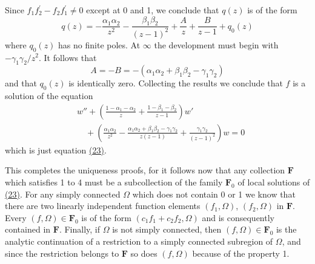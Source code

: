 Since $f_{1}f_{2}^{\prime} - f_{2}f_{1}^{\prime} \neq 0$ except at 0 and 1, we conclude that $q(z)$ is of the form
\begin{equation*}
q (z) = - \frac {\alpha_ {1} \alpha_ {2}}{z ^ {2}} - \frac {\beta_ {1} \beta_ {2}}{(z - 1) ^ {2}} + \frac {A}{z} + \frac {B}{z - 1} + q _ {0} (z)
\end{equation*}
where $q_0(z)$ has no finite poles. At $\infty$ the development must begin with $-\gamma_1\gamma_2 / z^2$. It follows that
\begin{equation*}
A = - B = - \left(\alpha_ {1} \alpha_ {2} + \beta_ {1} \beta_ {2} - \gamma_ {1} \gamma_ {2}\right)
\end{equation*}
and that $q_0(z)$ is identically zero. Collecting the results we conclude that $f$ is a solution of the equation
\begin{equation*}
\begin{aligned}
&w''+\left(\frac{1-\alpha_1-\alpha_2}{z}+\frac{1-\beta_1-\beta_2}{z-1}\right)w'\\
&\quad+\left(\frac{\alpha_1\alpha_2}{z^2}
-\frac{\alpha_1\alpha_2+\beta_1\beta_2-\gamma_1\gamma_2}{z(z-1)}
+\frac{\gamma_1\gamma_2}{(z-1)^2}\right)w=0
\end{aligned}
\end{equation*}
which is just equation \hyperref[eq:8.23]{(23)}.

This completes the uniqueness proofs, for it follows now that any collection $\mathbf{F}$ which satisfies 1 to 4 must be a subcollection of the family $\mathbf{F}_0$ of local solutions of \hyperref[eq:8.23]{(23)}. For any simply connected $\Omega$ which does not contain 0 or 1 we know that there are two linearly independent function elements $(f_1,\Omega)$, $(f_2,\Omega)$ in $\mathbf{F}$. Every $(f,\Omega) \in \mathbf{F}_0$ is of the form $(c_1f_1 + c_2f_2,\Omega)$ and is consequently contained in $\mathbf{F}$. Finally, if $\Omega$ is not simply connected, then $(f,\Omega) \in \mathbf{F}_0$ is the analytic continuation of a restriction to a simply connected subregion of $\Omega$, and since the restriction belongs to $\mathbf{F}$ so does $(f,\Omega)$ because of the property 1.

